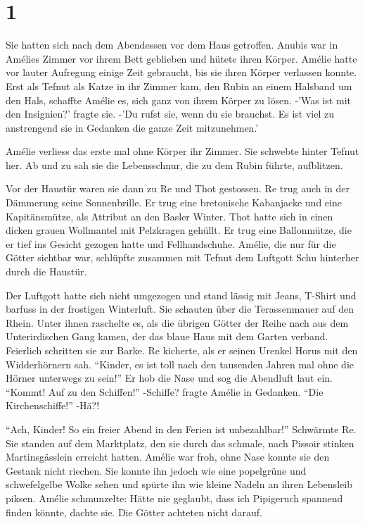 \documentclass[11pt,titlepage,a5paper]{book}
\begin{document}
\section*{1}

Sie hatten sich nach dem Abendessen vor dem Haus getroffen. Anubis war in Amélies Zimmer vor ihrem Bett geblieben und hütete ihren Körper. Amélie hatte vor lauter Aufregung einige Zeit gebraucht, bis sie ihren Körper verlassen konnte. Erst als Tefnut als Katze in ihr Zimmer kam, den Rubin an einem Halsband um den Hals,  schaffte Amélie es, sich ganz von ihrem Körper zu lösen. -'Was ist mit den Insignien?' fragte sie. -'Du rufst sie, wenn du sie brauchst. Es ist viel zu anstrengend sie in Gedanken die ganze Zeit mitzunehmen.'

Amélie verliess das erste mal ohne Körper ihr Zimmer. Sie schwebte hinter Tefnut her. Ab und zu sah sie die Lebensschnur, die zu dem Rubin führte, aufblitzen.

Vor der Haustür waren sie dann zu Re und Thot gestossen. Re trug auch in der Dämmerung seine Sonnenbrille. Er trug eine bretonische Kabanjacke und eine Kapitänsmütze, als Attribut an den Basler Winter. Thot hatte sich in einen dicken grauen Wollmantel mit Pelzkragen gehüllt. Er trug eine Ballonmütze, die er tief ins Gesicht gezogen hatte und Fellhandschuhe. Amélie, die nur für die Götter sichtbar war, schlüpfte zusammen mit Tefnut dem Luftgott Schu hinterher durch die Haustür.

Der Luftgott hatte sich nicht umgezogen und stand lässig mit Jeans, T-Shirt und barfuss in der frostigen Winterluft. Sie schauten über die Terassenmauer auf den Rhein. Unter ihnen raschelte es, als die übrigen Götter der Reihe nach aus dem Unterirdischen Gang kamen, der das blaue Haus mit dem Garten verband. Feierlich schritten sie zur Barke. Re kicherte, als er seinen Urenkel Horus mit den Widderhörnern sah. "`Kinder, es ist toll nach den tausenden Jahren mal ohne die Hörner unterwegs zu sein!"' Er hob die Nase und sog die Abendluft laut ein. "`Kommt! Auf zu den Schiffen!"' -Schiffe? fragte Amélie in Gedanken. "`Die Kirchenschiffe!"' -Hä?!

"`Ach, Kinder! So ein freier Abend in den Ferien ist unbezahlbar!"' Schwärmte Re. Sie standen auf dem Marktplatz, den sie durch das schmale, nach Pissoir stinken Martinsgässlein erreicht hatten. Amélie war froh, ohne Nase konnte sie den Gestank nicht riechen. Sie konnte ihn jedoch wie eine popelgrüne und schwefelgelbe Wolke sehen und spürte ihn wie kleine Nadeln an ihren Lebensleib piksen. Amélie schmunzelte: Hätte nie geglaubt, dass ich Pipigeruch spannend finden könnte, dachte sie. Die Götter achteten nicht darauf.
\end{document}
